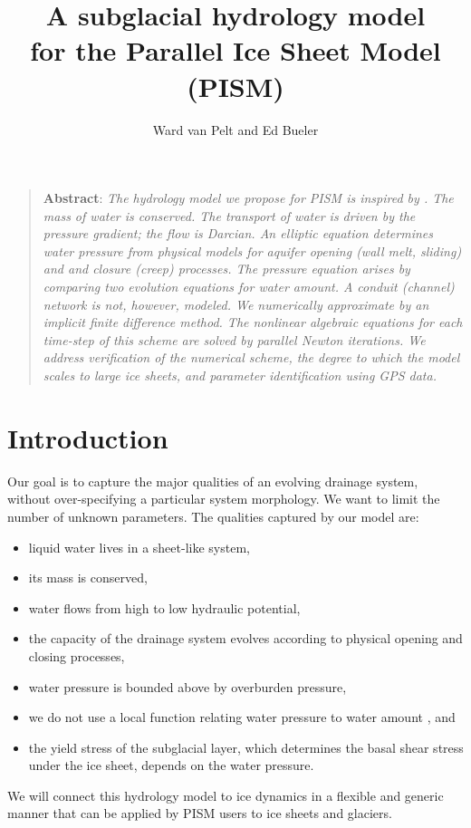 \documentclass[11pt]{amsart}
\title[PISM hydrology model]{A subglacial hydrology model \\for the Parallel Ice Sheet Model (PISM)}
\author[van Pelt and Bueler]{Ward van Pelt and Ed Bueler}
\begin{document}
\maketitle

\begin{quote}
\textbf{Abstract}:  \emph{The hydrology model we propose for PISM is inspired by  \emph{\citet{Schoofmeltsupply,Schoofetal2012,Hewitt2011,Hewittetal2012}}.  The mass of water is conserved.  The transport of water is driven by the pressure gradient; the flow is Darcian.  An elliptic equation determines water pressure from physical models for aquifer opening (wall melt, sliding) and and closure (creep) processes.  The pressure equation arises by comparing two evolution equations for water amount.  A conduit (channel) network is not, however, modeled.  We numerically approximate by an implicit finite difference method.  The nonlinear algebraic equations for each time-step of this  scheme are solved by parallel Newton iterations.  We address verification of the numerical scheme, the degree to which the model scales to large ice sheets, and parameter identification using GPS data.}
\end{quote}

\thispagestyle{empty}

\setcounter{tocdepth}{1}
\tableofcontents

\section{Introduction}

Our goal is to capture the major qualities of an evolving drainage system, without over-specifying a particular system morphology.  We want to limit the number of unknown parameters.  The qualities captured by our model are:
\renewcommand{\labelenumi}{\emph{(\roman{enumi})}\quad}
\begin{itemize}
\item liquid water lives in a sheet-like system,
\item its mass is conserved,
\item water flows from high to low hydraulic potential,
\item the capacity of the drainage system evolves according to physical opening and closing processes,
\item water pressure is bounded above by overburden pressure,
\item we do not use a local function relating water pressure to water amount \citep[c.f.][]{FlowersClarke2002_theory}, and
\item the yield stress of the subglacial layer, which determines the basal shear stress under the ice sheet, depends on the water pressure.
\end{itemize}
We will connect this hydrology model to ice dynamics in a flexible and generic manner that can be applied by PISM users to ice sheets and glaciers.
\end{document}
